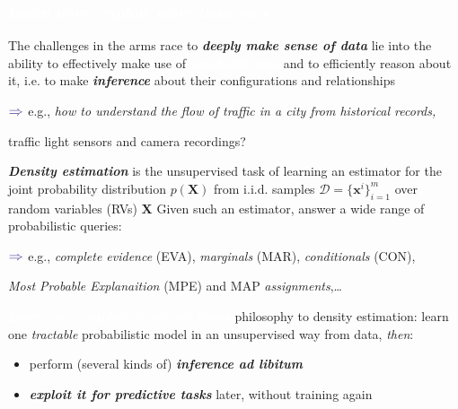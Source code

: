 \documentclass[xcolor={usenames,dvipsnames,svgnames}, compress]{beamer}
\newcommand{\highlighttext}[2][yellow]{{\colorbox{#1}{\textcolor{white}{#2}}}}
\begin{document}
\begin{frame}[t]
  \frametitle{\highlighttext[tomato4]{Learn \emph{once}, exploit \emph{more than once}}}
  \footnotesize
  
   The challenges in the arms race to \emph{\textbf{deeply
       make sense of data}}
   lie into the  ability to effectively make use of \highlighttext[tomato0]{\emph{\textbf{unlabeled data}}}
   and to efficiently reason about it, i.e. to make
   \emph{\textbf{inference}} about their configurations and
   relationships\par
   \hfill\begin{minipage}{1.0\linewidth}
    \vspace{5pt}
    \raggedleft
    $\color{violet}\boldsymbol\Rightarrow$
    \scriptsize
    e.g., \it
    how to understand the flow of traffic in a city from historical
    records,\par
    traffic light sensors and camera recordings?
  \end{minipage}\par\bigskip

   \emph{\textbf{Density estimation}} is the unsupervised task of
    learning an estimator for the joint probability distribution
    $p(\mathbf{X})$ from i.i.d. samples $\mathcal{D}=\{\mathbf
    x^i\}_{i=1}^m$ over random variables (RVs) $\mathbf{X}$
    Given such an estimator, answer a wide range of probabilistic
    queries:\par
    \hfill\begin{minipage}{0.75\linewidth}
    \vspace{5pt}
    \raggedleft
    $\color{violet}\boldsymbol\Rightarrow$
    \scriptsize
    e.g., \emph{complete evidence} (EVA), \emph{marginals} (MAR), \emph{conditionals} (CON),\par
    \emph{Most Probable Explanaition} (MPE) and MAP \emph{assignments},\dots%
  \end{minipage}\par\bigskip

    \highlighttext[tomato0]{\textbf{\emph{Learn once, exploit it several times}}} philosophy to
  density estimation: learn one \emph{tractable} probabilistic model
  in an unsupervised way from data, \emph{then}:
  \begin{itemize}
    \setlength{\itemsep}{0pt}
  \item perform (several kinds of) \emph{\textbf{inference ad
        libitum}}
    \item \emph{\textbf{exploit it for predictive tasks}} later, without training again
  \end{itemize}



\end{frame}
\end{document}
